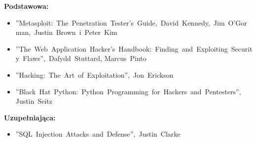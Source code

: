 \documentclass[12pt, a4paper]{article}
\begin{document}
\textbf{Podstawowa:}
\begin{itemize}
  \item ''Metasploit: The Penetration Tester's Guide, David Kennedy, Jim O'Gorman, Justin Brown i Peter Kim
  \item ''The Web Application Hacker's Handbook: Finding and Exploiting Security Flaws'', Dafydd Stuttard, Marcus Pinto
  \item ''Hacking: The Art of Exploitation'', Jon Erickson
  \item ''Black Hat Python: Python Programming for Hackers and Pentesters'', Justin Seitz
\end{itemize}

\textbf{Uzupełniająca:}
\begin{itemize}
  \item ''SQL Injection Attacks and Defense'', Justin Clarke
\end{itemize}
\end{document}
